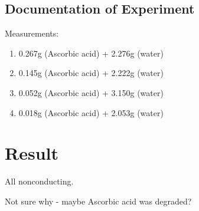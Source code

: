 \documentclass{article}
\begin{document}
\subsection{Documentation of Experiment}
Measurements:
\begin{enumerate}
    \item 0.267g (Ascorbic acid) + 2.276g (water)
    \item 0.145g (Ascorbic acid) + 2.222g (water)
    \item 0.052g (Ascorbic acid) + 3.150g (water)
    \item 0.018g (Ascorbic acid) + 2.053g (water)
\end{enumerate}

\section{Result}
All nonconducting. \par
\noindent Not sure why - maybe Ascorbic acid was degraded? 
\end{document}
